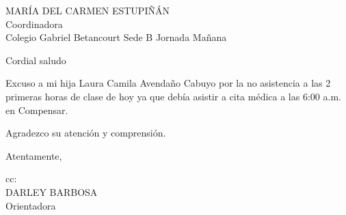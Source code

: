 \documentclass[letterpaper,spanish,11pt]{letter}
\begin{document}
\begin{letter}{MARÍA DEL CARMEN ESTUPIÑÁN\\Coordinadora\\Colegio Gabriel Betancourt Sede B Jornada Mañana}
	
\opening{Cordial saludo}
Excuso a mi hija Laura Camila Avendaño Cabuyo por la no asistencia a las 2 primeras horas de clase de hoy ya que debía asistir a cita médica a las 6:00 a.m. en Compensar.

Agradezco su atención y comprensión.
\closing{Atentamente,}

cc{:\\DARLEY BARBOSA\\
Orientadora}

\end{letter}
\end{document}
